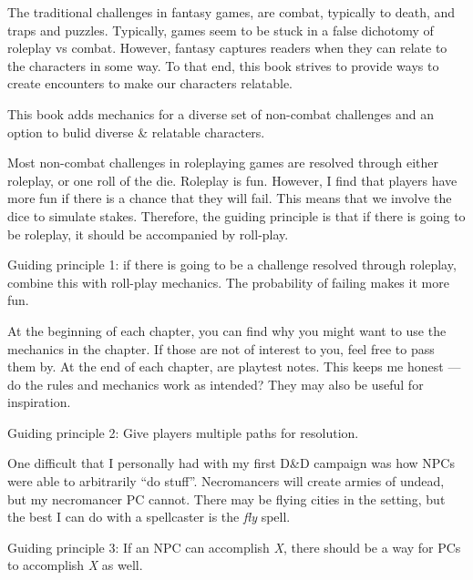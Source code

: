 \documentclass[twocolumn]{dndbook}
\begin{document}
The traditional challenges in fantasy games, are combat, typically to death, and traps and puzzles.
Typically, games seem to be stuck in a false dichotomy of roleplay vs combat.
However, fantasy captures readers when they can relate to the characters in some way.
To that end, this book strives to provide ways to create encounters to make our characters relatable.\par

\begin{emphasisParagraph}
This book adds mechanics for a diverse set of non-combat challenges and an option to bulid diverse \& relatable characters.
\end{emphasisParagraph}

Most non-combat challenges in roleplaying games are resolved through either roleplay, or one roll of the die.
Roleplay is fun. However, I find that players have more fun if there is a chance that they will fail.
This means that we involve the dice to simulate stakes.
Therefore, the guiding principle is that if there is going to be roleplay, it should be accompanied by roll-play.\par

\begin{emphasisParagraph}
	Guiding principle 1: if there is going to be a challenge resolved through roleplay, combine this with roll-play mechanics.
	The probability of failing makes it more fun.
\end{emphasisParagraph}

At the beginning of each chapter, you can find why you might want to use the mechanics in the chapter.
If those are not of interest to you, feel free to pass them by.
At the end of each chapter, are playtest notes.
This keeps me honest --- do the rules and mechanics work as intended?
They may also be useful for inspiration.\par

\begin{emphasisParagraph}
	Guiding principle 2: Give players multiple paths for resolution.
\end{emphasisParagraph}

One difficult that I personally had with my first D\&D campaign was how NPCs were able to arbitrarily ``do stuff''.
Necromancers will create armies of undead, but my necromancer PC cannot.
There may be flying cities in the setting, but the best I can do with a spellcaster is the \emph{fly} spell.



\begin{emphasisParagraph}
	Guiding principle 3: If an NPC can accomplish \emph{X}, there should be a way for PCs to accomplish \emph{X} as well.
\end{emphasisParagraph}
\end{document}
